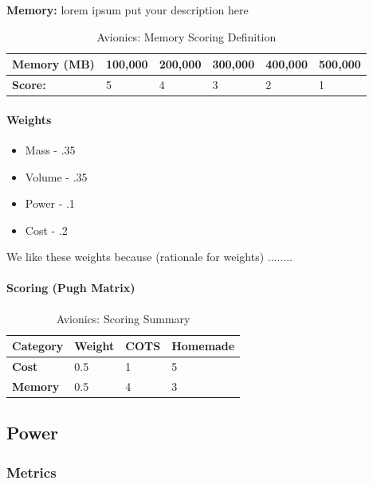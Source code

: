 \documentclass[3p]{elsarticle}
\begin{document}
\textbf{Memory:} lorem ipsum put your description here
\begin{table}[H]
\centering
\begin{tabular}{|l|l|l|l|l|l|} 
\hline
    \textbf{Memory (MB) } & 100,000 & 200,000 & 300,000 & 400,000 & 500,000
    \\
\hline
    \textbf{Score:} & 5 & 4 & 3 & 2 & 1
    \\
\hline
\end{tabular}
\caption{Avionics: Memory Scoring Definition \cite{einstein}}
\label{tbl:avionicsmemory}
\end{table}

\paragraph{Weights}
\begin{itemize}
    \item Mass - .35
    \item Volume - .35
    \item Power - .1
    \item Cost - .2
\end{itemize}

We like these weights because (rationale for weights) ........ 

\paragraph{Scoring (Pugh Matrix)}

\begin{table}[H]
\centering
\begin{tabular}{|l|l|l|l|} 
\hline
    \textbf{Category} & \textbf{Weight} & \textbf{COTS} & \textbf{Homemade}
    \\
\hline
    \textbf{Cost} & 0.5 & 1 & 5
    \\
\hline
    \textbf{Memory} & 0.5 & 4 & 3
    \\
\hline
\end{tabular}
\caption{Avionics: Scoring Summary \cite{einstein}}
\label{tbl:avionicsscoresy}
\end{table}

\subsection{Power}
\subsubsection{Metrics}
\end{document}
